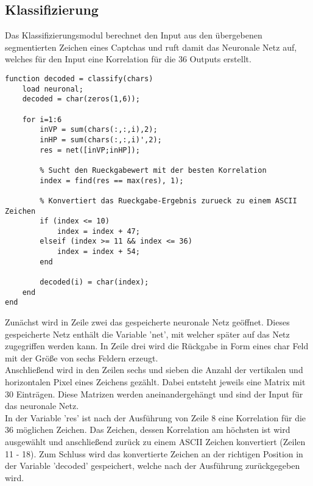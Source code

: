 \subsection{Klassifizierung}
Das Klassifizierungsmodul berechnet den Input aus den übergebenen segmentierten Zeichen eines Captchas und ruft damit das Neuronale Netz auf, welches für den Input eine Korrelation für die 36 Outputs erstellt.
\begin{lstlisting}
function decoded = classify(chars)
    load neuronal;
    decoded = char(zeros(1,6));
    
    for i=1:6
        inVP = sum(chars(:,:,i),2);
        inHP = sum(chars(:,:,i)',2);
        res = net([inVP;inHP]);
   
        % Sucht den Rueckgabewert mit der besten Korrelation
        index = find(res == max(res), 1);
        
        % Konvertiert das Rueckgabe-Ergebnis zurueck zu einem ASCII Zeichen
        if (index <= 10)
            index = index + 47;
        elseif (index >= 11 && index <= 36)
            index = index + 54;
        end

        decoded(i) = char(index);
    end
end
\end{lstlisting}
Zunächst wird in Zeile zwei das gespeicherte neuronale Netz geöffnet. Dieses gespeicherte Netz enthält die Variable 'net', mit welcher später auf das Netz zugegriffen werden kann. In Zeile drei wird die Rückgabe in Form eines char Feld mit der Größe von sechs Feldern erzeugt.\\
Anschließend wird in den Zeilen sechs und sieben die Anzahl der vertikalen und horizontalen Pixel eines Zeichens gezählt. Dabei entsteht jeweils eine Matrix mit 30 Einträgen. Diese Matrizen werden aneinandergehängt und sind der Input für das neuronale Netz.\\
In der Variable 'res' ist nach der Ausführung von Zeile 8 eine Korrelation für die 36 möglichen Zeichen. Das Zeichen, dessen Korrelation am höchsten ist wird ausgewählt und anschließend zurück zu einem ASCII Zeichen konvertiert (Zeilen 11 - 18). Zum Schluss wird das konvertierte Zeichen an der richtigen Position in der Variable 'decoded' gespeichert, welche nach der Ausführung zurückgegeben wird. 

\newpage
